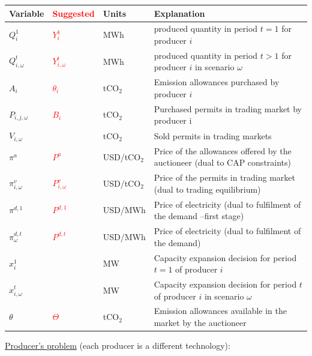 \documentclass[11pt, letterpaper]{article}
\newcommand\boldred[1]{\textcolor{red}{\textbf{#1}}}
\begin{document}
\begin{center}
\begin{tabular}{  l l l l  } 
 \hline
 \textbf{Variable} & \boldred{Suggested} & \textbf{Units} & \textbf{Explanation} \\ 
 \hline
 \hline
 $Q^{1}_i$ & \boldred{$Y^{1}_{i}$} & MWh & produced quantity in period $t =1  $ for producer $i$\\
 $Q^{t}_{i,\omega}$ & \boldred{$Y^{t}_{i,\omega}$} & MWh & produced quantity in period $t > 1 $ for producer $i$ in scenario $\omega$ \\  
 $A_i$ & \boldred{$\theta_i$} & tCO$_2$ & Emission allowances purchased by producer $i$ \\ 
 $P_{i,j,\omega}$ & \boldred{$B_i$}& tCO$_2$ & Purchased permits in trading market by producer i  \\
 $V_{i,\omega}$ & & tCO$_2$ & Sold permits in trading markets \\
 $\pi^{a}$ & \boldred{$P^{a}$} & USD/tCO$_2$  & Price of the allowances offered by the auctioneer (dual to CAP constraints)\\
 $\pi^{v}_{i,\omega}$ & \boldred{$P^{v}_{i,\omega}$} & USD/tCO$_2$  & Price of the permits in trading market (dual to trading equilibrium)\\
  $\pi^{d,1}$ & \boldred{$P^{d,1}$} & USD/MWh  & Price of electricity (dual to fulfilment of the demand --first stage)\\
 $\pi^{d,t}_{\omega}$ & \boldred{$P^{d,t}$} & USD/MWh  & Price of electricity (dual to fulfilment of the demand)\\
 $x^{1}_i$ & & MW  & Capacity expansion decision for period $t=1$ of producer $i$\\
 $x^{t}_{i,\omega}$ & & MW  & Capacity expansion decision for period $t$ of producer $i$ in scenario $\omega$\\
  $\theta$ & \boldred{$\Theta$} & tCO$_2$ & Emission allowances available in the market by the auctioneer\\
\hline
\end{tabular}
\end{center}

\vspace{0.5cm}


\underline{Producer's problem} (each producer is a different technology):
\end{document}
